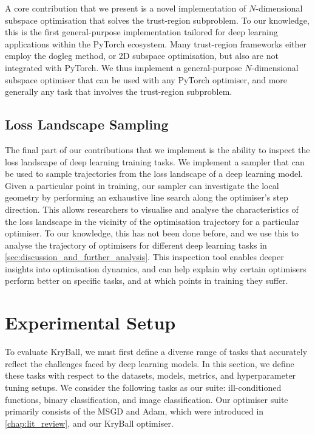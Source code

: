 A core contribution that we present is a novel implementation of $N$-dimensional subspace optimisation that solves the trust-region subproblem. To our knowledge, this is the first general-purpose implementation tailored for deep learning applications within the PyTorch ecosystem. Many trust-region frameworks either employ the dogleg method, or 2D subspace optimisation, but also are not integrated with PyTorch. We thus implement a general-purpose $N$-dimensional subspace optimiser that can be used with any PyTorch optimiser, and more generally any task that involves the trust-region subproblem. 

\subsection{Loss Landscape Sampling}
\label{ssec:loss_landscape_sampling}

The final part of our contributions that we implement is the ability to inspect the loss landscape of deep learning training tasks. We implement a sampler that can be used to sample trajectories from the loss landscape of a deep learning model. Given a particular point in training, our sampler can investigate the local geometry by performing an exhaustive line search along the optimiser's step direction. This allows researchers to visualise and analyse the characteristics of the loss landscape in the vicinity of the optimisation trajectory for a particular optimiser. To our knowledge, this has not been done before, and we use this to analyse the trajectory of optimisers for different deep learning tasks in \cref{sec:discussion_and_further_analysis}. This inspection tool enables deeper insights into optimisation dynamics, and can help explain why certain optimisers perform better on specific tasks, and at which points in training they suffer.

\section{Experimental Setup}
\label{sec:experimental_setup}
To evaluate KryBall, we must first define a diverse range of tasks that accurately reflect the challenges faced by deep learning models. In this section, we define these tasks with respect to the datasets, models, metrics, and hyperparameter tuning setups. We consider the following tasks as our suite: ill-conditioned functions, binary classification, and image classification. Our optimiser suite primarily consists of the MSGD and Adam, which were introduced in \cref{chap:lit_review}, and our KryBall optimiser. 

